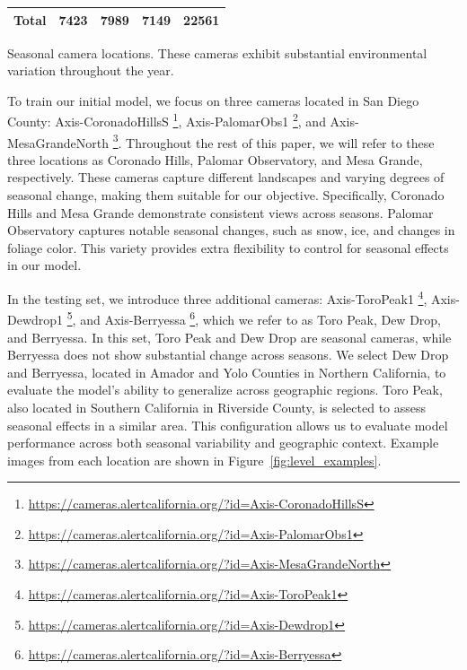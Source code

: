 \documentclass{article}
\begin{document}
\begin{table}[H]
\begin{threeparttable}
\begin{tabular}{@{}lrrrr@{}}
\midrule
\textbf{Total} & 7423 & 7989 & 7149 & 22561 \\
\bottomrule
\end{tabular}

\begin{tablenotes}
\footnotesize
\item[*]Seasonal camera locations. These cameras exhibit substantial environmental variation throughout the year.
\end{tablenotes}

\end{threeparttable}
\end{table}


To train our initial model, we focus on three cameras located in San Diego County: Axis-CoronadoHillsS \footnote{\url{https://cameras.alertcalifornia.org/?id=Axis-CoronadoHillsS}}, Axis-PalomarObs1 \footnote{\url{https://cameras.alertcalifornia.org/?id=Axis-PalomarObs1}}, and Axis-MesaGrandeNorth \footnote{\url{https://cameras.alertcalifornia.org/?id=Axis-MesaGrandeNorth}}. Throughout the rest of this paper, we will refer to these three locations as Coronado Hills, Palomar Observatory, and Mesa Grande, respectively. These cameras capture different landscapes and varying degrees of seasonal change, making them suitable for our objective. Specifically, Coronado Hills and Mesa Grande demonstrate consistent views across seasons. Palomar Observatory captures notable seasonal changes, such as snow, ice, and changes in foliage color. This variety provides extra flexibility to control for seasonal effects in our model. 

In the testing set, we introduce three additional cameras: Axis-ToroPeak1 \footnote{\url{https://cameras.alertcalifornia.org/?id=Axis-ToroPeak1}}, Axis-Dewdrop1 \footnote{\url{https://cameras.alertcalifornia.org/?id=Axis-Dewdrop1}}, and Axis-Berryessa \footnote{\url{https://cameras.alertcalifornia.org/?id=Axis-Berryessa}}, which we refer to as Toro Peak, Dew Drop, and Berryessa. In this set, Toro Peak and Dew Drop are seasonal cameras, while Berryessa does not show substantial change across seasons. We select Dew Drop and Berryessa, located in Amador and Yolo Counties in Northern California, to evaluate the model's ability to generalize across geographic regions. Toro Peak, also located in Southern California in Riverside County, is selected to assess seasonal effects in a similar area. This configuration allows us to evaluate model performance across both seasonal variability and geographic context. Example images from each location are shown in Figure~\ref{fig:level_examples}. 
\end{document}
